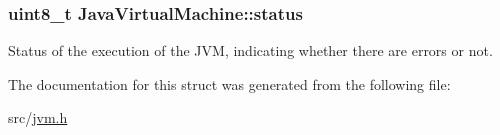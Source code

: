 \subsubsection[{\texorpdfstring{status}{status}}]{\setlength{\rightskip}{0pt plus 5cm}uint8\+\_\+t Java\+Virtual\+Machine\+::status}\hypertarget{structJavaVirtualMachine_ae8571f20c0db273c88a5ce2d52d51a04}{}\label{structJavaVirtualMachine_ae8571f20c0db273c88a5ce2d52d51a04}


Status of the execution of the J\+VM, indicating whether there are errors or not. 



The documentation for this struct was generated from the following file\+:\begin{DoxyCompactItemize}
\item 
src/\hyperlink{jvm_8h}{jvm.\+h}\end{DoxyCompactItemize}
